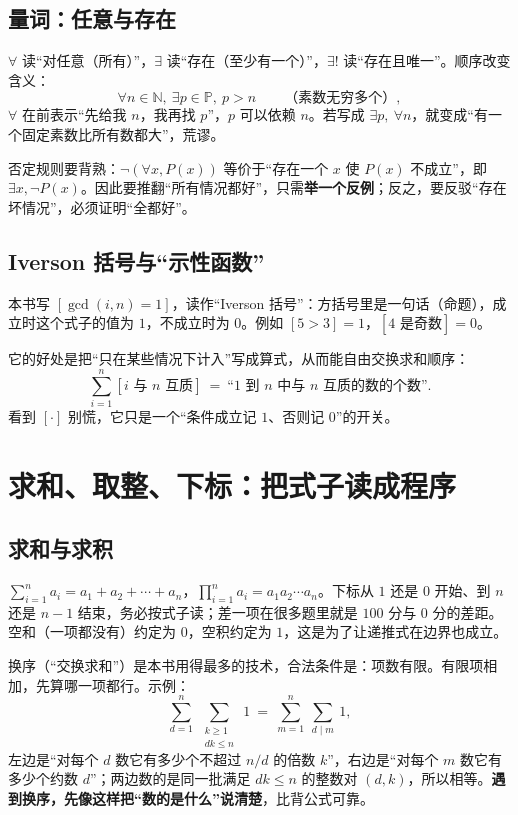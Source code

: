 \documentclass[UTF8,a4paper,11pt,oneside,openany,fontset=fandol]{ctexbook}
\theoremstyle{definition}
\newcommand{\N}{\mathbb N}
\newcommand{\Pp}{\mathbb P}
\newcommand{\iva}[1]{\left[#1\right]}
\begin{document}
\subsection{量词：任意与存在}
$\forall$ 读“对任意（所有）”，$\exists$ 读“存在（至少有一个）”，$\exists!$ 读“存在且唯一”。顺序改变含义：
\[
\forall n\in\N,\ \exists p\in\Pp,\ p>n\qquad\text{（素数无穷多个）},
\]
$\forall$ 在前表示“先给我 $n$，我再找 $p$”，$p$ 可以依赖 $n$。若写成 $\exists p,\ \forall n$，就变成“有一个固定素数比所有数都大”，荒谬。

否定规则要背熟：$\lnot(\forall x,P(x))$ 等价于“存在一个 $x$ 使 $P(x)$ 不成立”，即 $\exists x,\lnot P(x)$。因此要推翻“所有情况都好”，只需\textbf{举一个反例}；反之，要反驳“存在坏情况”，必须证明“全都好”。

\subsection{Iverson 括号与“示性函数”}
本书写 $\iva{\gcd(i,n)=1}$，读作“Iverson 括号”：方括号里是一句话（命题），成立时这个式子的值为 $1$，不成立时为 $0$。例如 $\iva{5>3}=1$，$\iva{4\text{ 是奇数}}=0$。

它的好处是把“只在某些情况下计入”写成算式，从而能自由交换求和顺序：
\[
\sum_{i=1}^{n}\iva{i\text{ 与 }n\text{ 互质}}\ =\ \text{“}1\text{ 到 }n\text{ 中与 }n\text{ 互质的数的个数”}.
\]
看到 $\iva{\cdot}$ 别慌，它只是一个“条件成立记 $1$、否则记 $0$”的开关。

\section{求和、取整、下标：把式子读成程序}
\subsection{求和与求积}
$\sum_{i=1}^{n}a_i=a_1+a_2+\cdots+a_n$，$\prod_{i=1}^{n}a_i=a_1a_2\cdots a_n$。下标从 $1$ 还是 $0$ 开始、到 $n$ 还是 $n-1$ 结束，务必按式子读；差一项在很多题里就是 $100$ 分与 $0$ 分的差距。空和（一项都没有）约定为 $0$，空积约定为 $1$，这是为了让递推式在边界也成立。

换序（“交换求和”）是本书用得最多的技术，合法条件是：项数有限。有限项相加，先算哪一项都行。示例：
\[
\sum_{d=1}^{n}\ \sum_{\substack{k\ge 1\\dk\le n}}\ 1\ =\ \sum_{m=1}^{n}\ \sum_{d\mid m}\ 1,
\]
左边是“对每个 $d$ 数它有多少个不超过 $n/d$ 的倍数 $k$”，右边是“对每个 $m$ 数它有多少个约数 $d$”；两边数的是同一批满足 $dk\le n$ 的整数对 $(d,k)$，所以相等。\textbf{遇到换序，先像这样把“数的是什么”说清楚}，比背公式可靠。
\end{document}
